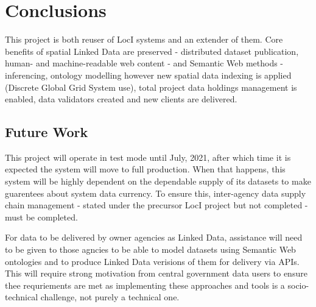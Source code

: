 \documentclass[runningheads]{llncs}
\begin{document}
\section{Conclusions}\label{sec:conclusions}
This project is both reuser of LocI systems and an extender of them. Core benefits of spatial Linked Data are preserved - distributed dataset publication, human- and machine-readable 
web content - and Semantic Web methods - inferencing, ontology modelling however new spatial data indexing is applied (Discrete Global Grid System use), total project data holdings management is
enabled, data validators created and new clients are delivered.


\subsection{Future Work}\label{sec:futurework}
This project will operate in test mode until July, 2021, after which time it is expected the system will move to full production. When that happens, this system will be highly dependent on the 
dependable supply of its datasets to make guarentees about system data currency. To ensure this, inter-agency data supply chain management - stated under the precursor LocI project but not completed - 
must be completed. 

For data to be delivered by owner agencies as Linked Data, assistance will need to be given to those agncies to be able to model datasets using Semantic Web ontologies and to produce Linked Data verisions
of them for delivery via APIs. This will require strong motivation from central government data users to ensure thee requriements are met as implementing these approaches and tools is a socio-technical
challenge, not purely a technical one.


%
%
%


%




\end{document}
